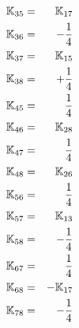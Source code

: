 \begin{eqnarray}
\K_{35} &=& \K_{17} \nn\\
\K_{36} &=& -\frac14 \nn\\
\K_{37} &=& \K_{15} \nn\\
\K_{38} &=& +\frac14   \nn\\
\K_{45} &=& \frac14 \nn\\
\K_{46} &=& \K_{28} \nn\\
\K_{47} &=& \frac14 \nn\\
\K_{48} &=& \K_{26} \nn\\
\K_{56} &=& \frac14 \nn\\
\K_{57} &=& \K_{13} \nn\\
\K_{58} &=& -\frac14 \nn\\
\K_{67} &=& \frac14 \nn\\
\K_{68} &=& -\K_{17} \nn\\
\K_{78} &=& -\frac14 \nn
\end{eqnarray}




\newpage

